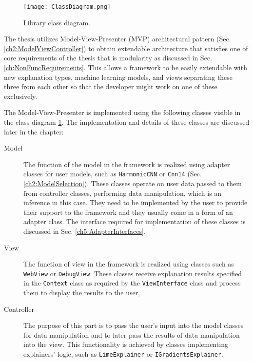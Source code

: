 \documentclass[
    bindingoffset=5mm,  %
    footnoteindent=3mm, %
    hyphenation=true    %
]{src/wut-thesis}
\begin{document}
\begin{figure}%
    \centering
    \texttt{[image: ClassDiagram.png]}
    \caption{Library class diagram.}
    \label{fig:ClassDiagram}
\end{figure}

    The thesis utilizes Model-View-Presenter (MVP) architectural pattern
    (Sec. \ref{ch2:ModelViewController}) to obtain extendable architecture that satisfies
    one of core requirements of the thesis that is modularity as discussed in
    Sec. \ref{ch:NonFuncRequirements}. This allows a framework to be easily extendable with 
    new explanation types, machine learning models, and views separating these three from
    each other so that the developer might work on one of these exclusively.

    The Model-View-Presenter is implemented using
    the following classes visible in the class diagram \ref{fig:ClassDiagram}.
    The implementation and details of these classes are discussed later in the chapter:
    \begin{description}
        \item[Model] The function of the model in the framework is realized using adapter classes for user
        models, such as \texttt{HarmonicCNN} or \texttt{Cnn14} (Sec. \ref{ch2:ModelSelection}). These classes
        operate on user data passed to them from controller classes, performing data manipulation, which is an
        inference in this case. They need to be implemented by the user to provide their support to the framework and they usually come in a form of an adapter class.
        The interface required for implementation of these classes is discussed     
        in Sec. \ref{ch5:AdapterInterfaces},

        \item[View] The function of view in the framework is realized using classes such as \texttt{WebView}
        or \texttt{DebugView}. These classes receive explanation results specified in the \texttt{Context}
        class as required by the \texttt{ViewInterface} class and process them to display the results
        to the user,

        \item[Controller] The purpose of this part is to pass the user’s input into the model
        classes for data manipulation and to later pass the results of data manipulation into 
        the view. This functionality is achieved by classes implementing explainers' logic, 
        such as \texttt{LimeExplainer} or \texttt{IGradientsExplainer}.
    \end{description}
\end{document}

